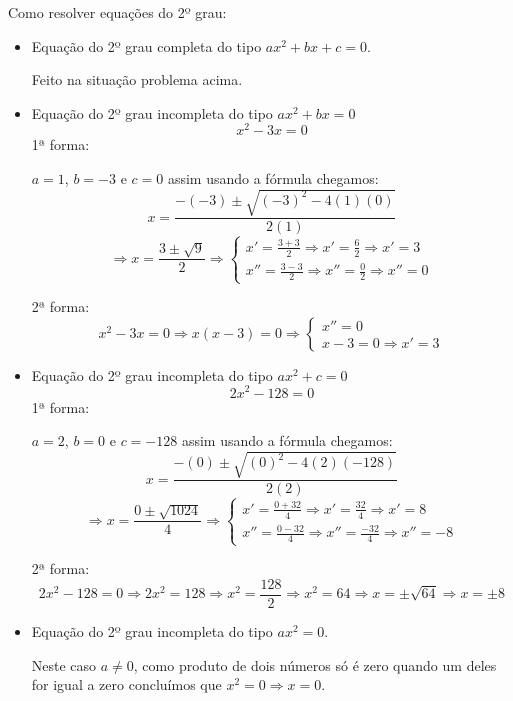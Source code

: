 \begin{exem}
 Como resolver equações do 2º grau:
 \begin{itemize}
  \item Equação do 2º grau completa do tipo $ax^2 + bx + c = 0$.

  Feito na situação problema acima.
  \item Equação do 2º grau incompleta do tipo $ax^2 + bx = 0$
  \[x^2 - 3x = 0\]
  1ª forma:

  $a = 1$, $b = -3$ e $c = 0$ assim usando a fórmula chegamos:
  \[x = \frac{- (-3) \pm \sqrt{(-3)^2 - 4 (1)(0)}}{2 (1)}\]
  \[\Rightarrow x = \frac{3 \pm \sqrt{9}}{2} \Rightarrow \begin{cases}
                                                          x' = \frac{3 + 3}{2} \Rightarrow x' = \frac{6}{2} \Rightarrow x' = 3 \\
                                                          x'' = \frac{3 - 3}{2} \Rightarrow x''= \frac{0}{2} \Rightarrow x''= 0
                                                         \end{cases}\]

  2ª forma:
  \[x^2 - 3x = 0 \Rightarrow x(x - 3)=0 \Rightarrow \begin{cases}
                                                     x''= 0 \\
                                                     x - 3 = 0 \Rightarrow x' = 3
                                                    \end{cases}\]


  \item Equação do 2º grau incompleta do tipo $ax^2 + c = 0$
  \[2x^2 - 128 = 0\]
  1ª forma:

  $a = 2$, $b = 0$ e $c = -128$ assim usando a fórmula chegamos:
  \[x = \frac{- (0) \pm \sqrt{(0)^2 - 4 (2)(-128)}}{2 (2)}\]
  \[\Rightarrow x = \frac{0 \pm \sqrt{1024}}{4} \Rightarrow \begin{cases}
                                                          x' = \frac{ 0 + 32}{4} \Rightarrow x' = \frac{32}{4} \Rightarrow x' = 8 \\
                                                          x'' = \frac{0 - 32}{4} \Rightarrow x''= \frac{-32}{4} \Rightarrow x''= -8
                                                         \end{cases}\]


  2ª forma:
  \[2x^2 - 128 = 0 \Rightarrow 2x^2 = 128 \Rightarrow x^2 = \frac{128}{2} \Rightarrow x^2 = 64 \Rightarrow x = \pm \sqrt{64} \Rightarrow x = \pm 8\]

  \item Equação do 2º grau incompleta do tipo $ax^2 = 0$.

  Neste caso $a \neq 0$, como produto de dois números só é zero quando um deles for igual a zero concluímos que $x^2 = 0 \Rightarrow x =0$.
  \end{itemize}
\end{exem}

